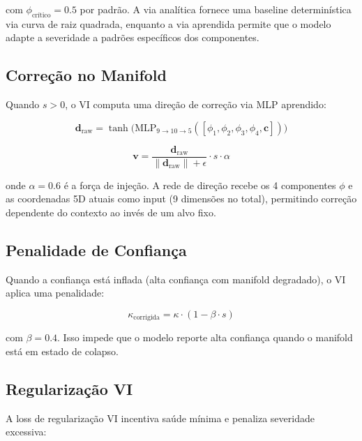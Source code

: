 com $\phi_{\text{cr\'itico}} = 0.5$ por padr\~ao. A via anal\'itica fornece
uma baseline determin\'istica via curva de raiz quadrada, enquanto a via
aprendida permite que o modelo adapte a severidade a padr\~oes espec\'ificos
dos componentes.

\subsection{Corre\c{c}\~ao no Manifold}

Quando $s > 0$, o VI computa uma dire\c{c}\~ao de corre\c{c}\~ao via MLP
aprendido:

\begin{equation}
    \bm{d}_{\text{raw}} = \tanh\big(\text{MLP}_{9 \to 10 \to 5}([\phi_1, \phi_2, \phi_3, \phi_4, \bm{c}])\big)
\end{equation}

\begin{equation}
    \bm{v} = \frac{\bm{d}_{\text{raw}}}{\|\bm{d}_{\text{raw}}\| + \epsilon} \cdot s \cdot \alpha
    \label{eq:vi_correction}
\end{equation}

onde $\alpha = 0.6$ \'e a for\c{c}a de inje\c{c}\~ao. A rede de dire\c{c}\~ao
recebe os 4 componentes $\phi$ e as coordenadas 5D atuais como input
(9 dimens\~oes no total), permitindo corre\c{c}\~ao dependente do contexto
ao inv\'es de um alvo fixo.

\subsection{Penalidade de Confian\c{c}a}

Quando a confian\c{c}a est\'a inflada (alta confian\c{c}a com manifold
degradado), o VI aplica uma penalidade:

\begin{equation}
    \kappa_{\text{corrigida}} = \kappa \cdot (1 - \beta \cdot s)
    \label{eq:vi_conf_penalty}
\end{equation}

com $\beta = 0.4$. Isso impede que o modelo reporte alta confian\c{c}a
quando o manifold est\'a em estado de colapso.

\subsection{Regulariza\c{c}\~ao VI}

A loss de regulariza\c{c}\~ao VI incentiva sa\'ude m\'inima e penaliza
severidade excessiva:

